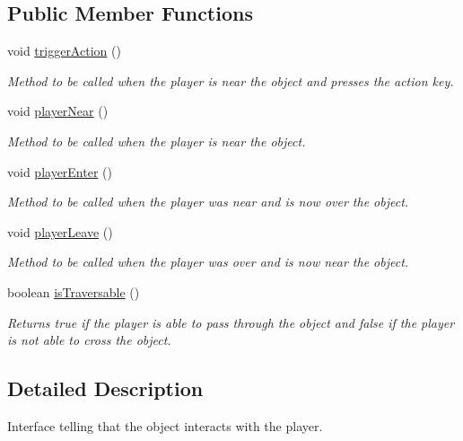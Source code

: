 \subsection*{Public Member Functions}
\begin{DoxyCompactItemize}
\item 
void \hyperlink{interfaceworld_1_1_interactive_object_a841a0e3dba2416de9a7d12c73725ec0d}{trigger\-Action} ()
\begin{DoxyCompactList}\small\item\em Method to be called when the player is near the object and presses the action key. \end{DoxyCompactList}\item 
void \hyperlink{interfaceworld_1_1_interactive_object_a8cebf64b8b0823be212f7c0a0a29d044}{player\-Near} ()
\begin{DoxyCompactList}\small\item\em Method to be called when the player is near the object. \end{DoxyCompactList}\item 
void \hyperlink{interfaceworld_1_1_interactive_object_ab3cca356bc5980e1a229e2f3f954237a}{player\-Enter} ()
\begin{DoxyCompactList}\small\item\em Method to be called when the player was near and is now over the object. \end{DoxyCompactList}\item 
void \hyperlink{interfaceworld_1_1_interactive_object_acf8ca40042c26ee08bf2cba15e12ae59}{player\-Leave} ()
\begin{DoxyCompactList}\small\item\em Method to be called when the player was over and is now near the object. \end{DoxyCompactList}\item 
boolean \hyperlink{interfaceworld_1_1_interactive_object_aa1066b03a82447c77ac45bd29a2d051a}{is\-Traversable} ()
\begin{DoxyCompactList}\small\item\em Returns true if the player is able to pass through the object and false if the player is not able to cross the object. \end{DoxyCompactList}\end{DoxyCompactItemize}


\subsection{Detailed Description}
Interface telling that the object interacts with the player. 

